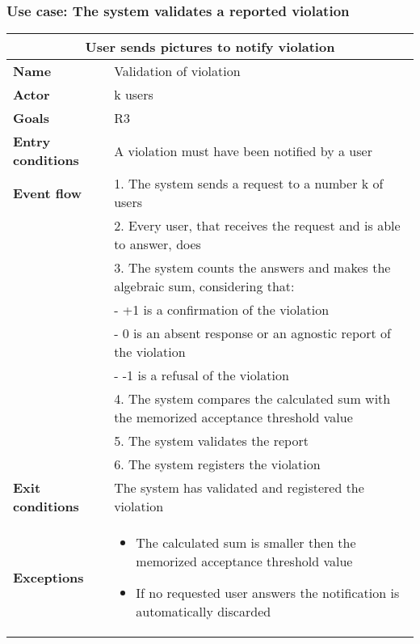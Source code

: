 \subsubsection{Use case: The system validates a reported violation}
\begin{center}
    \begin{tabular}{|p{3cm}|p{7cm}|}
        \multicolumn{2}{c}{\textbf{User sends pictures to notify violation}} \\
        \hline
        \textbf{Name} & Validation of violation  \\
        \hline
        \textbf{Actor} & k users \\
        \hline
        \textbf{Goals} & R3 \\
        \hline
        \textbf{Entry conditions} & A violation must have been notified by a user \\
        \hline
        \textbf{Event flow} & 1. The system sends a request to a number k of users \\ 
        & 2. Every user, that receives the request and is able to answer, does \\ 
        & 3. The system counts the answers and makes the algebraic sum, considering that:\\
        &   - +1 is a confirmation of the violation \\
        &   - 0 is an absent response or an agnostic report of the violation \\
        &   - -1 is a refusal of the violation \\
        & 4. The system compares the calculated sum with the memorized acceptance threshold value \\
        & 5. The system validates the report\\ 
        & 6. The system registers the violation \\ 
        \hline
        \textbf{Exit conditions} & The system has validated and registered the violation \\
        \hline
        \textbf{Exceptions}
        & \begin{itemize}
            \item The calculated sum is smaller then the memorized acceptance threshold value
            \item If no requested user answers the notification is automatically discarded
        \end{itemize} \\
        \hline
    \end{tabular}
\end{center}

